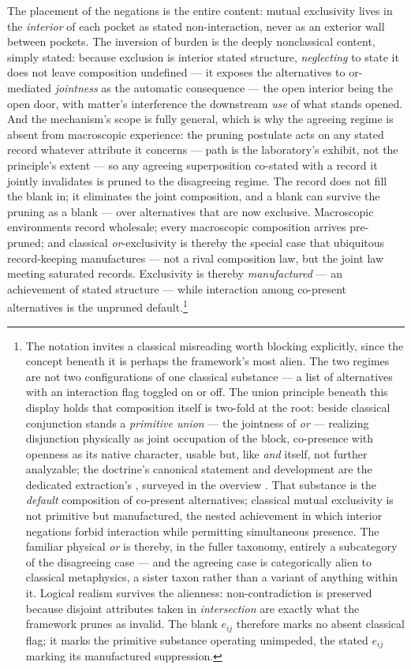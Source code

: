 The placement of the negations is the entire content: mutual exclusivity lives in the \emph{interior} of each pocket as stated non-interaction, never as an exterior wall between pockets. The inversion of burden is the deeply nonclassical content, simply stated: because exclusion is interior stated structure, \emph{neglecting} to state it does not leave composition undefined --- it exposes the alternatives to or-mediated \emph{jointness} as the automatic consequence --- the open interior being the open door, with matter's interference the downstream \emph{use} of what stands opened. And the mechanism's scope is fully general, which is why the agreeing regime is absent from macroscopic experience: the pruning postulate acts on any stated record whatever attribute it concerns --- path is the laboratory's exhibit, not the principle's extent --- so any agreeing superposition co-stated with a record it jointly invalidates is pruned to the disagreeing regime. The record does not fill the blank in; it eliminates the joint composition, and a blank can survive the pruning as a blank --- over alternatives that are now exclusive. Macroscopic environments record wholesale; every macroscopic composition arrives pre-pruned; and classical \emph{or}-exclusivity is thereby the special case that ubiquitous record-keeping manufactures --- not a rival composition law, but the joint law meeting saturated records. Exclusivity is thereby \emph{manufactured} --- an achievement of stated structure --- while interaction among co-present alternatives is the unpruned default.\footnote{The notation invites a classical misreading worth blocking explicitly, since the concept beneath it is perhaps the framework's most alien. The two regimes are not two configurations of one classical substance --- a list of alternatives with an interaction flag toggled on or off. The union principle beneath this display holds that composition itself is two-fold at the root: beside classical conjunction stands a \emph{primitive union} --- the jointness of \emph{or} --- realizing disjunction physically as joint occupation of the block, co-presence with openness as its native character, usable but, like \emph{and} itself, not further analyzable; the doctrine's canonical statement and development are the dedicated extraction's \cite{AethusUnion}, surveyed in the overview \cite{AethusBrief}. That substance is the \emph{default} composition of co-present alternatives; classical mutual exclusivity is not primitive but manufactured, the nested achievement in which interior negations forbid interaction while permitting simultaneous presence. The familiar physical \emph{or} is thereby, in the fuller taxonomy, entirely a subcategory of the disagreeing case --- and the agreeing case is categorically alien to classical metaphysics, a sister taxon rather than a variant of anything within it. Logical realism survives the alienness: non-contradiction is preserved because disjoint attributes taken in \emph{intersection} are exactly what the framework prunes as invalid. The blank $e_{ij}$ therefore marks no absent classical flag; it marks the primitive substance operating unimpeded, the stated $e_{ij}$ marking its manufactured suppression.}



